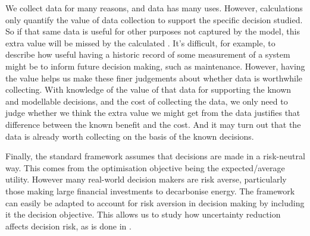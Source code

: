 We collect data for many reasons, and data has many uses. However,  calculations only quantify the value of data collection to support the specific decision studied. So if that same data is useful for other purposes not captured by the model, this extra value will be missed by the calculated . It's difficult, for example, to describe how useful having a historic record of some measurement of a system might be to inform future decision making, such as maintenance. However, having the  value helps us make these finer judgements about whether data is worthwhile collecting. With knowledge of the value of that data for supporting the known and modellable decisions, and the cost of collecting the data, we only need to judge whether we think the extra value we might get from the data justifies that difference between the known benefit and the cost. And it may turn out that the data is already worth collecting on the basis of the known decisions.

Finally, the standard  framework assumes that decisions are made in a risk-neutral way. This comes from the optimisation objective being the expected/average utility. However many real-world decision makers are risk averse, particularly those making large financial investments to decarbonise energy. The framework can easily be adapted to account for risk aversion in decision making by including it the decision objective. This allows us to study how uncertainty reduction affects decision risk, as is done in .\\

